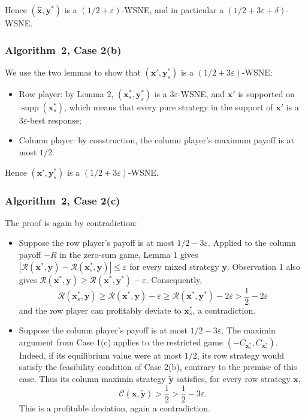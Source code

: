 Hence $(\hat{\mathbf{x}}, \mathbf{y}^*)$ is a $(1/2 + \varepsilon)$-WSNE, and in particular a $(1/2 + 3\varepsilon + \delta)$-WSNE.

\subsubsection{Algorithm~2, Case 2(b)}
\label{app:case-two-low-high}

We use the two lemmas to show that $(\mathbf{x}', \mathbf{y}_s^*)$ is a $(1/2 + 3\varepsilon)$-WSNE:

\begin{itemize}
  \item Row player: by Lemma 2, $(\mathbf{x}_s^*, \mathbf{y}_s^*)$ is a $3\varepsilon$-WSNE, and $\mathbf{x}'$ is supported on $\operatorname{supp}(\mathbf{x}_s^*)$, which means that every pure strategy in the support of $\mathbf{x}'$ is a $3\varepsilon$-best response;
  \item Column player: by construction, the column player's maximum payoff is at most $1/2$.
\end{itemize}

Hence $(\mathbf{x}', \mathbf{y}_s^*)$ is a $(1/2 + 3\varepsilon)$-WSNE.

\subsubsection{Algorithm~2, Case 2(c)}
\label{app:case-two-both-high}

The proof is again by contradiction:

\begin{itemize}
  \item Suppose the row player's payoff is at most $1/2-3\varepsilon$. Applied to the column payoff $-R$ in the zero-sum game, Lemma 1 gives
        $|\mathcal{R}(\mathbf{x}^*,\mathbf{y})-\mathcal{R}(\mathbf{x}_s^*,\mathbf{y})|\le\varepsilon$ for every mixed strategy $\mathbf{y}$. Observation 1 also gives
        $\mathcal{R}(\mathbf{x}^*,\mathbf{y})\ge\mathcal{R}(\mathbf{x}^*,\mathbf{y}^*)-\varepsilon$.
        Consequently,
        \[
          \mathcal{R}(\mathbf{x}_s^*, \mathbf{y}) \ge \mathcal{R}(\mathbf{x}^*, \mathbf{y}) - \varepsilon \ge \mathcal{R}(\mathbf{x}^*, \mathbf{y}^*) - 2\varepsilon > \frac{1}{2} - 2\varepsilon
        \]
        and the row player can profitably deviate to $\mathbf{x}_s^*$, a contradiction.

  \item Suppose the column player's payoff is at most $1/2-3\varepsilon$. The maximin argument from Case 1(c) applies to the restricted game $(-C_{\mathbf{x}_s^*},C_{\mathbf{x}_s^*})$. Indeed, if its equilibrium value were at most $1/2$, its row strategy would satisfy the feasibility condition of Case 2(b), contrary to the premise of this case. Thus its column maximin strategy $\tilde{\mathbf{y}}$ satisfies, for every row strategy $\mathbf{x}$,
        \[
          \mathcal{C}(\mathbf{x},\tilde{\mathbf{y}})>\frac12>\frac12-3\varepsilon.
        \]
        This is a profitable deviation, again a contradiction.
\end{itemize}

